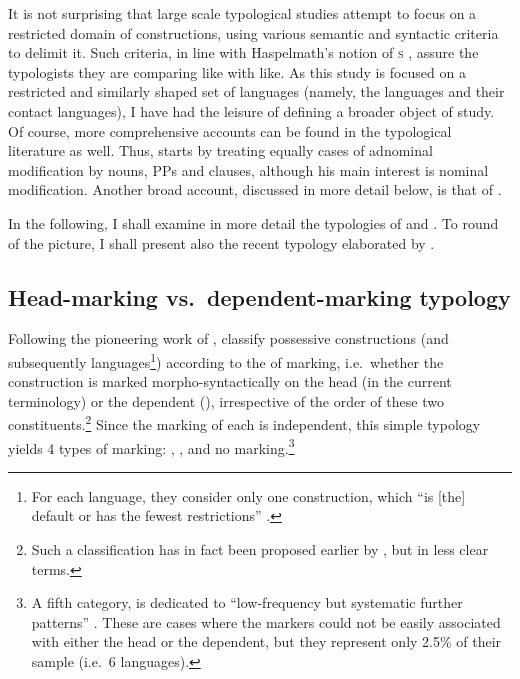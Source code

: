 It is not surprising that large scale typological studies attempt to focus on a restricted domain of constructions, using various semantic and syntactic criteria to delimit it. Such criteria, in line with Haspelmath's notion of \textsc{s} \citep{HaspelmathComparative}, assure the typologists they are comparing like with like. As this study is focused on a restricted and similarly shaped set of languages (namely, the  languages and their contact languages), I have had the leisure of defining a broader object of study. Of course, more comprehensive accounts can be found in the typological literature as well. Thus, \citet{Fairbanks} starts by treating equally cases of adnominal modification by nouns, PPs and clauses, although his main interest is nominal modification. Another broad account,  discussed in more detail below, is that of \citet{PlankIntro}.

In the following, I shall examine in more detail the typologies of \citet{NicholsBickelWals} and \citet{PlankIntro}. To round of the picture, I shall present also the recent typology elaborated by \citet{Riessler}.

\subsection{Head-marking vs.\ dependent-marking typology} \label{ss:head_vs_dep}
\largerpage[2]
Following the pioneering work of \citet{NicholsHead},  \citet{NicholsBickelWals} classify possessive constructions (and subsequently languages\footnote{For each language, they consider only one construction, which \enquote{is [the] default or has the fewest restrictions} \citep[\S 2]{NicholsBickelWals}.}) according to the  of marking, i.e.\ whether the construction is marked morpho-syntactically on the head (\prim in the current terminology) or the dependent (\secn), irrespective of the order of these two constituents.\footnote{Such a classification has in fact been proposed earlier by \citet{UltanPossession}, but in less clear terms.} Since the marking of each  is independent, this simple typology yields 4 types of marking: , ,  and no marking.\footnote{A fifth category, is dedicated to \enquote{low-frequency but systematic further patterns} \citep[\S 1.5]{NicholsBickelWals}. These are cases where the markers could not be easily associated with either the head or the dependent, but they represent only 2.5\% of their sample (i.e.\ 6 languages).} 

